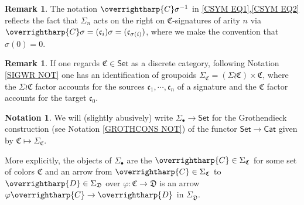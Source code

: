 \documentclass[a4paper,10pt
,draft
]{article}%
\numberwithin{equation}{section}
\numberwithin{figure}{section}
\theoremstyle{definition} %
\newtheorem{remark}[equation]{Remark}%
\newtheorem{notation}[equation]{Notation}%
\newcommand{\vect}[1]{\text{\overrightharp{\ensuremath{#1}}}}
\newcommand{\1}{\ensuremath{\mathbbm 1}}%
\begin{document}
\begin{remark}\label{GLOBSIG REM}
	The notation $\vect{C} \sigma^{-1}$
	in \eqref{CSYM EQ1},\eqref{CSYM EQ2}
	reflects the fact that $\Sigma_n$
	acts on the right on $\mathfrak{C}$-signatures of arity $n$
	via 
	$\vect{C} \sigma = (\mathfrak{c}_i)\sigma = 
	(\mathfrak{c}_{\sigma(i)})$,
	where we make the convention that $\sigma(0)=0$.
\end{remark}



\begin{remark}
	If one regards $\mathfrak{C} \in \mathsf{Set}$
	as a discrete category, 
	following Notation \ref{SIGWR NOT} one has an identification 
	of groupoids
	$\Sigma_{\mathfrak{C}} = (\Sigma \wr \mathfrak{C}) \times \mathfrak{C}$,
	where the 
	$\Sigma \wr \mathfrak{C}$ factor accounts for the sources
	$\mathfrak{c}_1,\cdots,\mathfrak{c}_n$ of a signature
	and the $\mathfrak{C}$ factor accounts for the target 
	$\mathfrak{c}_0$.
\end{remark}



\begin{notation}
	We will (slightly abusively) write
	$\Sigma_{\bullet} \to \mathsf{Set}$
	for the Grothendieck construction (see Notation \ref{GROTHCONS NOT})
	of the functor
	$\mathsf{Set} \to \mathsf{Cat}$ given by
	$\mathfrak{C} \mapsto \Sigma_{\mathfrak{C}}$.
	
	More explicitly, 
	the objects of $\Sigma_{\bullet}$
	are the $\vect{C} \in \Sigma_{\mathfrak{C}}$ 
	for some set of colors $\mathfrak{C}$
	and an arrow from
	$\vect{C} \in \Sigma_{\mathfrak{C}}$ to
	$\vect{D} \in \Sigma_{\mathfrak{D}}$
	over $\varphi \colon \mathfrak{C} \to \mathfrak{D}$
	is an arrow
	$\varphi \vect{C} \to \vect{D}$ in $\Sigma_{\mathfrak{D}}$.
\end{notation}
\end{document}
